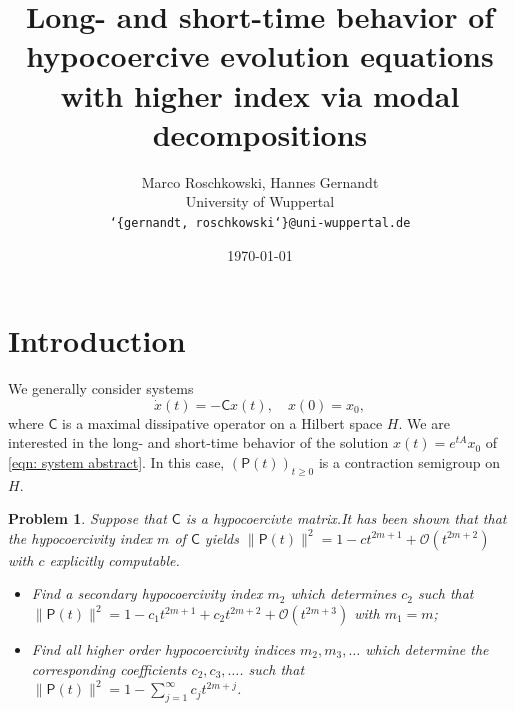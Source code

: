 \documentclass[12pt]{article}
\title{Long- and short-time behavior of hypocoercive evolution equations with higher index via modal decompositions}
\author{Marco Roschkowski, Hannes Gernandt \\
\normalsize University of Wuppertal \\
\normalsize \texttt{\char`\{gernandt, roschkowski\char`\}@uni-wuppertal.de}}
\date{\today}
\newcommand{\C}{\mathsf{C}}
\newcommand{\Pro}{\mathsf{P}}
\newtheorem{problem}{Problem}
\begin{document}
\section{Introduction}
We generally consider systems 
\begin{equation}\label{eqn: system abstract}
    \dot{x}(t) = -\C x(t), \quad x(0) = x_0,
\end{equation}
where $\C$ is a maximal dissipative operator on a Hilbert space $H$. We are interested in the long- and short-time behavior of the solution $x(t) = e^{tA}x_0$ of \eqref{eqn: system abstract}.
In this case, $(\Pro(t))_{t\geq 0}$ is a contraction semigroup on $H$.

\begin{problem}
    Suppose that $\C$ is a hypocoercivte matrix.It has been shown that \cite{achleitner2023hypocoercivity}
    that the hypocoercivity index $m$ of $\C$ yields
    $\|\Pro(t)\|^2 = 1 - c t^{2m+1} + \mathcal{O}(t^{2m+2})$ with $c$ explicitly computable.
    \begin{itemize}
        \item [\rm (a)] Find a \emph{secondary hypocoercivity index} $m_2$ which determines $c_2$ such that
        $\|\Pro(t)\|^2 = 1 - c_1 t^{2m+1} + c_2 t^{2m+2} + \mathcal{O}(t^{2m+3})$ with $m_1 = m$;
        \item [\rm (b)] Find all \emph{higher order hypocoercivity indices} $m_2, m_3, \ldots$ which determine the corresponding coefficients $c_2, c_3, \ldots$.
        such that $\|\Pro(t)\|^2 = 1 - \sum\limits_{j=1}^\infty c_j t^{2m + j}$.
    \end{itemize}
\end{problem}








\end{document}
